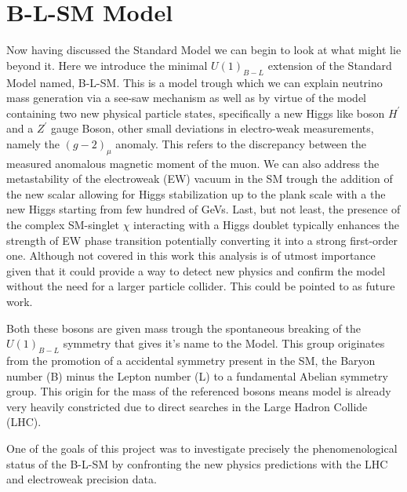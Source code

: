 
\newpage 

% 
% 
% 

\section{B-L-SM Model}


Now having discussed the Standard Model we can begin to look at what might lie beyond it. Here we introduce the minimal $U(1)_{B-L}$ extension of the Standard Model named, B-L-SM. This is a model trough which we can explain neutrino mass generation via a see-saw mechanism as well as by virtue of the model containing two new physical particle states, specifically a new Higgs like boson $H^\prime$ and a $Z^\prime$ gauge Boson, other small deviations in electro-weak measurements, namely the $(g-2)_\mu$ anomaly. This refers to the discrepancy between the measured anomalous magnetic moment of the muon. We can also address the metastability of the electroweak (EW) vacuum in the SM trough the addition of the new scalar allowing for Higgs stabilization up to the plank scale with a the new Higgs starting from few hundred of GeVs. Last, but not least, the presence of the complex SM-singlet $\chi$ interacting with a Higgs doublet typically enhances the strength of EW phase transition potentially converting it into a strong first-order one. Although not covered in this work this analysis is of utmost importance given that it could provide a way to detect new physics and confirm the model without the need for a larger particle collider. This could be pointed to as future work. 

Both these bosons are given mass trough the spontaneous breaking of the $U(1)_{B-L}$ symmetry that gives it's name to the Model. This group originates from the promotion of a accidental symmetry present in the SM, the Baryon number (B) minus the Lepton number (L) to a fundamental Abelian symmetry group. This origin for the mass of the referenced bosons means model is already very heavily constricted due to direct searches in the Large Hadron Collide (LHC). 

One of the goals of this project was to investigate precisely the phenomenological status of the B-L-SM by confronting the new physics predictions with the LHC and electroweak precision data.   

